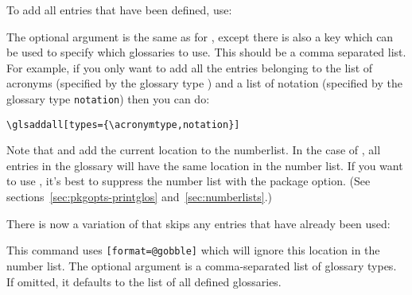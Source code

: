 \documentclass[report,inlinetitle]{nlctdoc}
\newcommand*{\gloskey}[2][newglossaryentry]{\csopt{#1}{#2}}
\begin{document}
To add all entries that have been defined, use:
\begin{definition}[\DescribeMacro{\glsaddall}]
\end{definition}
The optional argument is the same as for , except
there is also a key \gloskey[glsaddall]{types} which can be
used to specify which glossaries to use. This should be a
comma separated list. For example, if you only want to add
all the entries belonging to the list of acronyms (specified by
the glossary type ) and a list of
notation (specified by the glossary type \texttt{notation}) then you can
do:
\begin{verbatim}
\glsaddall[types={\acronymtype,notation}]
\end{verbatim}

\begin{important}
Note that  and  add the current location to
the \gls{numberlist}. In the case of , all entries in the
glossary will have the same location in the number list. If you want
to use , it's best to suppress the number list with
the  package option. (See
sections~\ref{sec:pkgopts-printglos} and~\ref{sec:numberlists}.)
\end{important}

There is now a variation of  that skips any entries
that have already been used:
\begin{definition}[\DescribeMacro\glsaddallunused]
\end{definition}
This command uses \texttt{[format=@gobble]} which will
ignore this location in the number list. The optional argument
 is a comma-separated list of glossary types. If omitted,
it defaults to the list of all defined glossaries.
\end{document}
